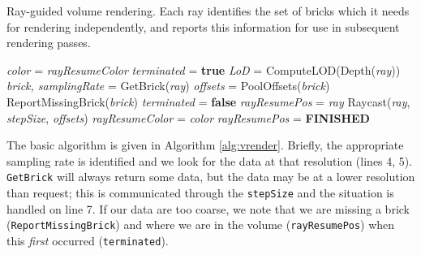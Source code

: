 \begin{algorithm}
  \caption{Ray-guided volume rendering.  Each ray identifies the
  set of bricks which it needs for rendering independently, and
  reports this information for use in subsequent rendering passes.}
  \label{alg:vrender}
  \begin{algorithmic}[1]
  \State \textit{color} = \textit{rayResumeColor}
  \State \textit{terminated} = \textbf{true} 
  \Repeat
    \State \textit{LoD} = ComputeLOD(Depth(\textit{ray}))
    \State \textit{brick, samplingRate} = GetBrick(\textit{ray})
    \State \textit{offsets} = PoolOffsets(\textit{brick})
      \State ReportMissingBrick(\textit{brick})
       
        \State \textit{terminated} = \textbf{false}
        \State \textit{rayResumePos} = \textit{ray}
      \EndIf
    \EndIf
    \State Raycast(\textit{ray}, \textit{stepSize}, \textit{offsets})
  \State \textit{rayResumeColor} = \textit{color}
    \State \textit{rayResumePos} = \textbf{FINISHED}
  \EndIf
  \end{algorithmic}
\end{algorithm}

The basic algorithm is given in Algorithm \ref{alg:vrender}.  Briefly, the
appropriate sampling rate is identified and we look for the data at
that resolution (lines 4, 5).
\texttt{GetBrick} will always return some data, but the data may be at
a lower resolution than request; this is
communicated through the \texttt{stepSize} and the situation is handled
on line 7.  If our data are too coarse, we note that we are missing a
brick (\texttt{ReportMissingBrick}) and where we are in the volume
(\texttt{rayResumePos}) when
this \emph{first} occurred (\texttt{terminated}).



